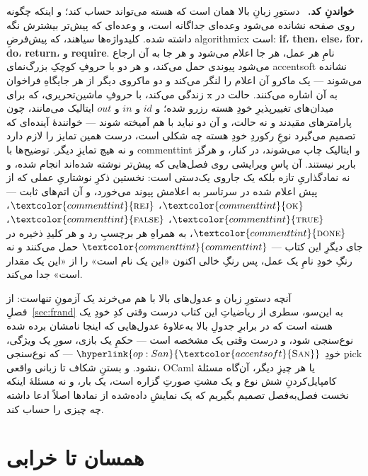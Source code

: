 \documentclass[10pt,oneside,openany]{book}
\newcommand{\op}[1]{\textnormal{\textsc{#1}}}
\newcommand{\opl}[1]{\hyperlink{op:#1}{\textcolor{accentsoft}{\op{#1}}}}
\newcommand{\id}{id}
\newcommand{\atom}[1]{\textcolor{commenttint}{\op{#1}}}
\newcommand{\rej}{\atom{rej}}
\newcommand{\ok}{\atom{ok}}
\newcommand{\true}{\atom{true}}
\newcommand{\false}{\atom{false}}
\newcommand{\done}{\atom{done}}
\newcommand{\San}{\opl{San}}
\newcommand{\V}[1]{\mathtt{#1}}
\newcommand{\heading}[1]{\medskip\par\noindent\textcolor{accent}{\textbf{#1.}}\ }
\theoremstyle{accentdef}
\theoremstyle{accentplain}
\begin{document}
\heading{خواندنِ کد} دستورِ زبانِ بالا همان است که هسته می‌تواند حساب کند؛ و
اینکه چگونه روی صفحه نشانده می‌شود وعده‌ای جداگانه است، و وعده‌ای که پیش‌تر
بیشترش نگه داشته شده. کلیدواژه‌ها سیاهند، که پیش‌فرضِ algorithmicx است:
\textbf{if}، \textbf{then}، \textbf{else}، \textbf{for}، \textbf{do}،
\textbf{return}، و \textbf{require}. نامِ هر عمل، هر جا اعلام می‌شود و هر جا
به آن ارجاع می‌شود پیوندی حمل می‌کند، و هر دو با حروفِ کوچکِ بزرگ‌نمای
\textcolor{accentsoft}{accentsoft} نشانده می‌شوند --- یک ماکرو آن اعلام را
لنگر می‌کند و دو ماکروی دیگر از هر جایگاهِ فراخوان به آن اشاره می‌کنند.
حالت در $\V{x}$ زندگی می‌کند، با حروفِ ماشین‌تحریری، که برای میدان‌های
تغییرپذیرِ خودِ هسته رزرو شده؛ و $\id$ و $in$ و $out$ ایتالیک می‌مانند، چون
پارامترهای مقیدند و نه حالت، و آن دو نباید با هم آمیخته شوند --- خوانندهٔ
آینده‌ای که تصمیم می‌گیرد نوعِ رکوردِ خودِ هسته چه شکلی است، درست همین تمایز
را لازم دارد و نه هیچ تمایزِ دیگر. توضیح‌ها با
\textcolor{commenttint}{commenttint} و ایتالیک چاپ می‌شوند، در کنار، و
هرگز باربر نیستند. آن پاسِ ویرایشی روی فصل‌هایی که پیش‌تر نوشته شده‌اند انجام
شده، و نه نمادگذاریِ تازه بلکه یک جاروی یک‌دستی است: نخستین ذکرِ نوشتاریِ
عملی که از پیش اعلام شده در سرتاسر به اعلامش پیوند می‌خورد، و آن اتم‌های
ثابت --- $\ok$، $\rej$، $\true$، $\false$، $\done$، به همراهِ هر برچسبِ رد و
هر کلیدِ ذخیره در جای دیگرِ این کتاب --- $\textcolor{commenttint}{commenttint}$
حمل می‌کنند و نه رنگِ خودِ نامِ یک عمل، پس رنگِ خالی اکنون «این یک نام است»
را از «این یک مقدار است» جدا می‌کند.

آنچه دستورِ زبان و عدول‌های بالا با هم می‌خرند یک آزمونِ تنهاست: از
فصلِ~\ref{sec:frand} به این‌سو، سطری از ریاضیاتِ این کتاب درست وقتی کدِ
خودِ یک هسته است که در برابرِ جدولِ بالا به‌علاوهٔ عدول‌هایی که اینجا نامشان
برده شده نوع‌سنجی شود، و درست وقتی یک مشخصه است --- حکمِ یک بازی، سورِ یک
ویژگی، $\mathrm{pick}$ِ خودِ $\San$ --- که نوع‌سنجی نشود. و بستنِ شکاف تا
زبانی واقعی، OCaml یا هر چیزِ دیگر، آن‌گاه مسئلهٔ کامپایل‌کردنِ شش نوع و یک
مشتِ صورتِ گزاره است، یک بار، و نه مسئلهٔ اینکه نخست فصل‌به‌فصل تصمیم
بگیریم که یک نمایشِ داده‌شده از نمادها اصلاً ادعا داشته چه چیزی را حساب
کند.

\chapter{همسان تا خرابی}\label{app:iub}
\end{document}
